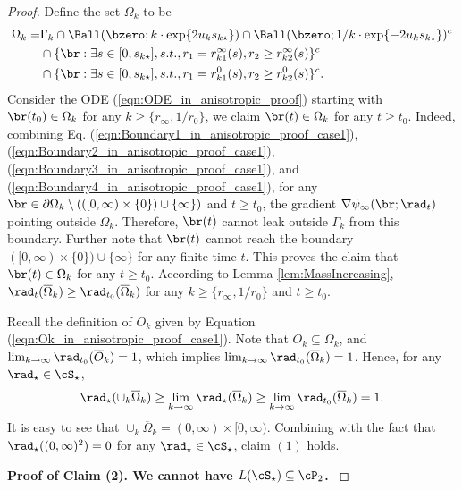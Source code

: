 \documentclass[11pt]{article}
\begin{document}
\begin{proof}
Define the set $\Omega_k$ to be 
\begin{equation}
\begin{aligned}
\Omega_k = & \Gamma_k \cap \Ball(\bzero; k \cdot \exp\{2 u_k s_{k\star} \}) \cap \Ball(\bzero; 1/k \cdot \exp\{-2u_k s_{k\star} \})^c \\
& \cap \{\br: \exists s \in [0, s_{k\star}], s.t., r_1 = r_{k1}^\infty(s), r_2 \ge r_{k2}^\infty(s)\}^c \\
& \cap \{\br: \exists s \in [0, s_{k\star}], s.t., r_1 = r_{k1}^0(s), r_2 \ge r_{k2}^0(s)\}^c. 
\end{aligned}
\end{equation}
Consider the ODE (\ref{eqn:ODE_in_anisotropic_proof}) starting with $\br(t_0) \in \Omega_k$ for any $k \ge \{r_\infty, 1/r_0 \}$, we claim $\br(t) \in \Omega_k$ for any $t \ge t_0$. Indeed, combining Eq. (\ref{eqn:Boundary1_in_anisotropic_proof_case1}), (\ref{eqn:Boundary2_in_anisotropic_proof_case1}), (\ref{eqn:Boundary3_in_anisotropic_proof_case1}), and (\ref{eqn:Boundary4_in_anisotropic_proof_case1}), for any $\br \in \partial \Omega_k \setminus ( ([0, \infty) \times \{ 0 \}) \cup \{ \infty \})$ and $t \ge t_0$, the gradient $\nabla \psi_\infty(\br; \rad_t)$ pointing outside $\Omega_k$. Therefore, $\br(t)$ cannot leak outside $\Gamma_k$ from this boundary. Further note that $\br(t)$ cannot reach the boundary $([0, \infty) \times \{ 0 \}) \cup \{ \infty \}$ for any finite time $t$. This proves the claim that $\br(t) \in \Omega_k$ for any $t \ge t_0$. According to Lemma \ref{lem:MassIncreasing}, $\rad_t(\overline  \Omega_k) \ge \rad_{t_0} (\overline \Omega_k)$ for any $k \ge \{r_\infty, 1/r_0 \}$ and $t \ge t_0$. 

Recall the definition of $O_k$ given by Equation (\ref{eqn:Ok_in_anisotropic_proof_case1}). Note that $O_k\subseteq \Omega_k$, and $\lim_{k \to \infty} \rad_{t_0}(\overline O_k) = 1$, which implies $\lim_{k \to \infty} \rad_{t_0}(\overline \Omega_k) = 1$. Hence, for any $\rad_\star \in \cS_\star$,
\begin{equation}
\rad_\star(\cup_k \overline \Omega_k) \ge \lim_{k \to \infty} \rad_\star(\overline \Omega_k) \ge \lim_{k \to \infty} \rad_{t_0}(\overline \Omega_k) = 1. 
\end{equation}
It is easy to see that $\cup_k \overline \Omega_k = (0, \infty) \times [0, \infty)$. Combining with the fact that $\rad_\star((0, \infty)^2) = 0$ for any $\rad_\star \in \cS_\star$, claim $(1)$ holds. 

\vskip 0.2cm
\noindent
{\bf Proof of Claim (2). We cannot have $L(\cS_\star) \subseteq \cP_2$. } 


\end{proof}
\end{document}

